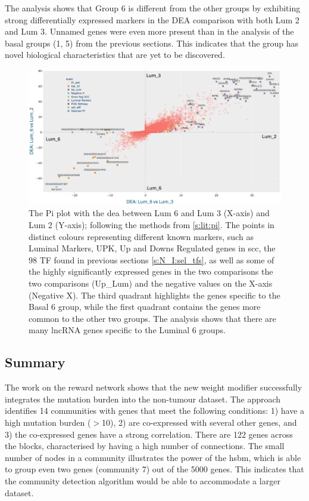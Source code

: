 The analysis shows that Group 6 is different from the other groups by exhibiting strong differentially expressed markers in the DEA comparison with both Lum 2 and Lum 3. Unnamed genes were even more present than in the analysis of the basal groups (1, 5) from the previous sections. This indicates that the group has novel biological characteristics that are yet to be discovered.


\begin{figure}  
    \centering
    \includegraphics[width=1.0\textwidth,height=1.0\textheight,keepaspectratio]{Sections/Network_II/resources/reward/PI_Lum_6.png}
    \caption[Pi plot highlighting the properties for Lum 6]{The Pi plot with the \acrfull{dea} between Lum 6 and Lum 3 (X-axis) and Lum 2 (Y-axis); following the methods from \cref{s:lit:pi}. The points in distinct colours representing different known markers, such as Luminal Markers, UPK, Up and Downs Regulated genes in \acrlong{scc}, the 98 TF found in previous sections \cref{s:N_I:sel_tfs}, as well as some of the highly significantly expressed genes in the two comparisons the two comparisons (Up\_Lum) and the negative values on the X-axis (Negative X). The third quadrant highlights the genes specific to the Basal 6 group, while the first quadrant contains the genes more common to the other two groups. The analysis shows that there are many \acrshort{lncRNA} genes specific to the Luminal 6 groups.}
    \label{fig:N_II:pi_lum_6}
\end{figure}


\subsection{Summary}


The work on the reward network shows that the new weight modifier successfully integrates the mutation burden into the non-tumour dataset. The approach identifies 14 communities with genes that meet the following conditions: 1) have a high mutation burden ($>$10), 2) are co-expressed with several other genes, and 3) the co-expressed genes have a strong correlation. There are 122 genes across the blocks, characterised by having a high number of connections. The small number of nodes in a community illustrates the power of the \acrlong{hsbm}, which is able to group even two genes (community 7) out of the 5000 genes. This indicates that the community detection algorithm would be able to accommodate a larger dataset.

